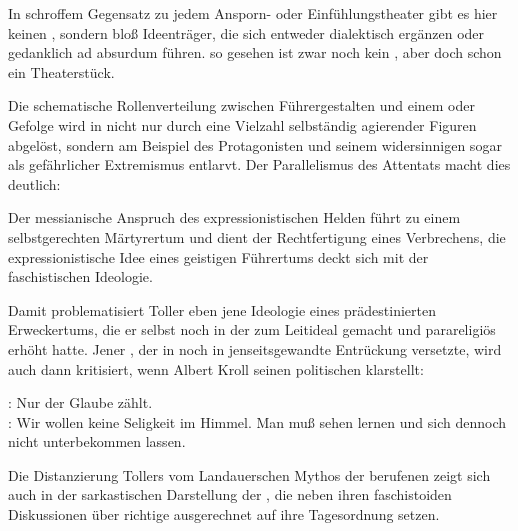 \begin{BlockQuote}
In schroffem Gegensatz zu jedem Ansporn- oder
Einfühlungstheater gibt es hier keinen , sondern bloß
Ideenträger, die sich entweder dialektisch ergänzen oder gedanklich ad
absurdum führen. so gesehen ist  zwar noch kein
, aber doch schon ein 
Theaterstück.
\end{BlockQuote} 
Die schematische Rollenverteilung zwischen Führergestalten und einem
 oder  Gefolge wird in  nicht nur durch eine Vielzahl selbständig agierender Figuren
abgelöst, 
sondern am Beispiel des Protagonisten und seinem widersinnigen
 sogar als gefährlicher Extremismus entlarvt. Der
Parallelismus des Attentats macht dies deutlich:

\begin{BlockQuote}
Der messianische Anspruch des expressionistischen Helden führt zu einem
selbstgerechten Märtyrertum und dient der Rechtfertigung eines Verbrechens,
die expressionistische Idee eines geistigen Führertums deckt sich mit der
faschistischen Ideologie.
\end{BlockQuote}
Damit problematisiert Toller eben jene Ideologie eines prädestinierten
Erweckertums, die er selbst noch in der  zum Leitideal
gemacht und parareligiös erhöht hatte. Jener \Cite{Glaube an die Menschheit},
der \Cite{die Frau} in  noch in jenseitsgewandte
Entrückung versetzte, wird auch dann kritisiert, wenn Albert Kroll seinen
politischen  klarstellt:

\begin{BlockQuote}
: Nur der Glaube zählt.\\
: Wir wollen keine Seligkeit im Himmel. Man muß sehen
lernen und sich dennoch nicht unterbekommen lassen. 
\end{BlockQuote}
Die Distanzierung Tollers vom Landauerschen Mythos der
berufenen  zeigt sich auch in der sarkastischen
Darstellung der \Cite{geistigen Kopfarbeiter}, die neben ihren faschistoiden
Diskussionen über richtige \Cite{Zuchtwahl}  ausgerechnet
\Cite{die proletarische Gemeinschaft der Liebe und die Aufgabe der Geistigen}
 auf ihre Tagesordnung
setzen.

